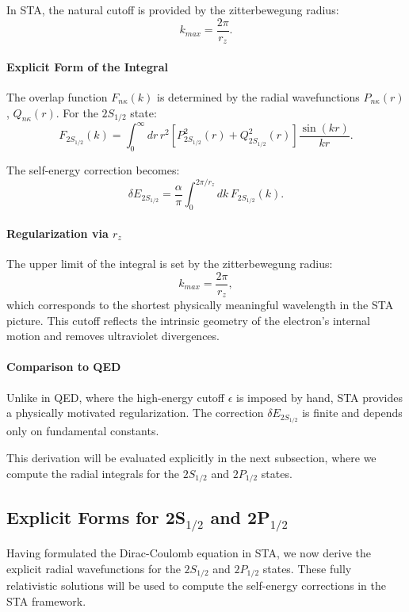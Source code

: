 \documentclass[12pt]{article}
\begin{document}
In STA, the natural cutoff is provided by the zitterbewegung radius:
\[
k_{max} = \frac{2\pi}{r_z}.
\]

\paragraph{Explicit Form of the Integral}
The overlap function \(F_{n\kappa}(k)\) is determined by the radial wavefunctions \(P_{n\kappa}(r)\), \(Q_{n\kappa}(r)\). For the \(2S_{1/2}\) state:
\[
F_{2S_{1/2}}(k) = \int_0^\infty dr\,r^2\left[P_{2S_{1/2}}^2(r)+Q_{2S_{1/2}}^2(r)\right]\frac{\sin(kr)}{kr}.
\]

The self-energy correction becomes:
\[
\delta E_{2S_{1/2}} = \frac{\alpha}{\pi}\int_0^{2\pi/r_z} dk\,F_{2S_{1/2}}(k).
\]

\paragraph{Regularization via \(r_z\)}
The upper limit of the integral is set by the zitterbewegung radius:
\[
k_{max}=\frac{2\pi}{r_z},
\]
which corresponds to the shortest physically meaningful wavelength in the STA picture. This cutoff reflects the intrinsic geometry of the electron's internal motion and removes ultraviolet divergences.

\paragraph{Comparison to QED}
Unlike in QED, where the high-energy cutoff \(\epsilon\) is imposed by hand, STA provides a physically motivated regularization. The correction \(\delta E_{2S_{1/2}}\) is finite and depends only on fundamental constants.

This derivation will be evaluated explicitly in the next subsection, where we compute the radial integrals for the \(2S_{1/2}\) and \(2P_{1/2}\) states.

\subsection{Explicit Forms for 2S$_{1/2}$ and 2P$_{1/2}$}\label{subsec:explicit_orbitals}

Having formulated the Dirac-Coulomb equation in STA, we now derive the explicit radial wavefunctions for the \(2S_{1/2}\) and \(2P_{1/2}\) states. These fully relativistic solutions will be used to compute the self-energy corrections in the STA framework.
\end{document}
